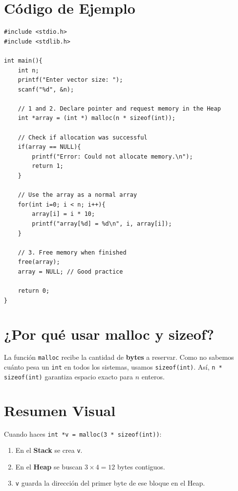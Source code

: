 \documentclass[12pt,a4paper]{article}
\begin{document}
\Needspace{12cm}
\section{Código de Ejemplo}
\begin{lstlisting}
#include <stdio.h>
#include <stdlib.h>

int main(){
    int n;
    printf("Enter vector size: ");
    scanf("%d", &n);

    // 1 and 2. Declare pointer and request memory in the Heap
    int *array = (int *) malloc(n * sizeof(int));

    // Check if allocation was successful
    if(array == NULL){
        printf("Error: Could not allocate memory.\n");
        return 1;
    }

    // Use the array as a normal array
    for(int i=0; i < n; i++){
        array[i] = i * 10;
        printf("array[%d] = %d\n", i, array[i]);
    }

    // 3. Free memory when finished
    free(array);
    array = NULL; // Good practice

    return 0;
}
\end{lstlisting}

\section{¿Por qué usar malloc y sizeof?}
La función \texttt{malloc} recibe la cantidad de \textbf{bytes} a reservar. Como no sabemos cuánto pesa un \texttt{int} en todos los sistemas, usamos \texttt{sizeof(int)}. Así, \texttt{n * sizeof(int)} garantiza espacio exacto para $n$ enteros.

\section{Resumen Visual}
Cuando haces \texttt{int *v = malloc(3 * sizeof(int))}:
\begin{enumerate}
    \item En el \textbf{Stack} se crea \texttt{v}.
    \item En el \textbf{Heap} se buscan $3 \times 4 = 12$ bytes contiguos.
    \item \texttt{v} guarda la dirección del primer byte de ese bloque en el Heap.
\end{enumerate}
\end{document}
